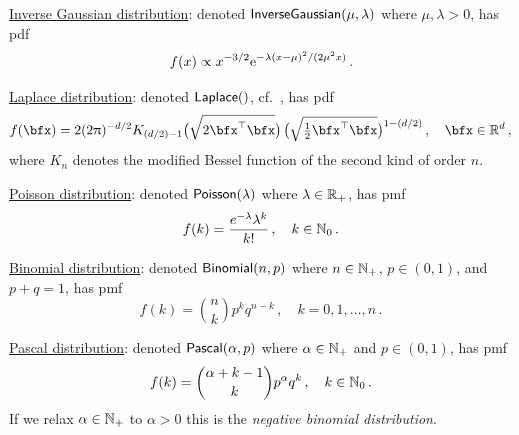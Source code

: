 \underline{Inverse Gaussian distribution}: denoted $\mathsf{InverseGaussian}(\mu,\lambda)$ where $\mu, \lambda > 0$, has pdf
\[ f(x) \propto x^{-3/2} \mathrm{e}^{-\lambda(x-\mu)^2/(2\mu^2x)}  \,. \]

\underline{Laplace distribution}: denoted $\mathsf{Laplace}()$, cf.\ \cite{eltoft2006multivariate,kotz2001asymmetric}, has pdf
\[
f(\bfx) = 2 (2 \pi)^{-d/2}  K_{(d/2) -1} \bigl( \sqrt{2 \bfx^\tr \bfx} \bigr) \,
 \bigl(\sqrt{\tfrac{1}{2} \bfx^\tr \bfx}\bigr)^{1-(d/2)} \,, \quad \bfx \in \RL^d \,,
\]
where $K_n$ denotes the modified Bessel function of the second kind of order $n$.

\underline{Poisson distribution}: denoted $\mathsf{Poisson}(\lambda)$ where $\lambda \in \mathbb{R}_+$, has pmf
\[ f(k) = \frac{e^{-\lambda}\lambda^{k}}{k!} \,, \quad k \in \mathbb{N}_0 \,. \]

\underline{Binomial distribution}: denoted $\mathsf{Binomial}(n,p)$ where $n \in \mathbb{N}_+$, $p \in (0,1)$, and $p+q=1$, has pmf
 \[ f(k) = \binom{n}{k} p^k q^{n-k} \,, \quad k = 0,1,\dots, n\,. \]

\underline{Pascal distribution}: denoted $\mathsf{Pascal}(\alpha,p)$ where $\alpha \in \mathbb{N}_+$ and $p \in (0,1)$, has pmf
\[ f(k) = \binom{\alpha+k-1}{k} p^\alpha q^k \,, \quad k \in \mathbb{N}_0 \,. \]
If we relax $\alpha \in \mathbb{N}_+$ to $\alpha > 0$ this is the \emph{negative binomial distribution}.

